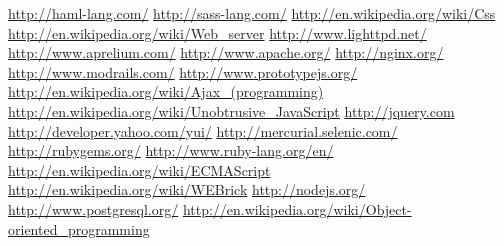 \documentclass[a4paper]{article}
\begin{document}
\newpage

\begin{thebibliography}{99}
   \url{http://haml-lang.com/}
   \url{http://sass-lang.com/}
   \url{http://en.wikipedia.org/wiki/Css}
   \url{http://en.wikipedia.org/wiki/Web\_server}
   \url{http://www.lighttpd.net/}
   \url{http://www.aprelium.com/}
   \url{http://www.apache.org/}
   \url{http://nginx.org/}
   \url{http://www.modrails.com/}
   \url{http://www.prototypejs.org/}
   \url{http://en.wikipedia.org/wiki/Ajax\_(programming)}
   \url{http://en.wikipedia.org/wiki/Unobtrusive\_JavaScript}
   \url{http://jquery.com}
   \url{http://developer.yahoo.com/yui/}
   \url{http://mercurial.selenic.com/}
   \url{http://rubygems.org/}
   \url{http://www.ruby-lang.org/en/}
   \url{http://en.wikipedia.org/wiki/ECMAScript}
   \url{http://en.wikipedia.org/wiki/WEBrick}
   \url{http://nodejs.org/}
   \url{http://www.postgresql.org/}
   \url{http://en.wikipedia.org/wiki/Object-oriented\_programming}
\end{thebibliography}
\end{document}

